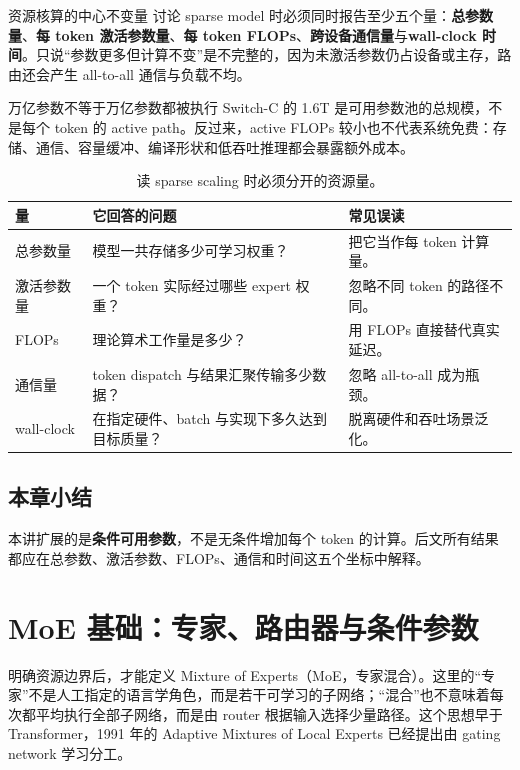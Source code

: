 \documentclass[a4paper]{article}
\begin{document}
\begin{importantbox}{资源核算的中心不变量}
讨论 sparse model 时必须同时报告至少五个量：\textbf{总参数量}、\textbf{每 token 激活参数量}、\textbf{每 token FLOPs}、\textbf{跨设备通信量}与\textbf{wall-clock 时间}。只说“参数更多但计算不变”是不完整的，因为未激活参数仍占设备或主存，路由还会产生 all-to-all 通信与负载不均。
\end{importantbox}

\begin{warningbox}{万亿参数不等于万亿参数都被执行}
Switch-C 的 1.6T 是可用参数池的总规模，不是每个 token 的 active path。反过来，active FLOPs 较小也不代表系统免费：存储、通信、容量缓冲、编译形状和低吞吐推理都会暴露额外成本。
\end{warningbox}

\begin{table}[H]
\centering
\small
\caption{读 sparse scaling 时必须分开的资源量。}
\begin{tabularx}{\textwidth}{L{0.22\textwidth}X X}
\toprule
量 & 它回答的问题 & 常见误读 \\
\midrule
总参数量 & 模型一共存储多少可学习权重？ & 把它当作每 token 计算量。 \\
激活参数量 & 一个 token 实际经过哪些 expert 权重？ & 忽略不同 token 的路径不同。 \\
FLOPs & 理论算术工作量是多少？ & 用 FLOPs 直接替代真实延迟。 \\
通信量 & token dispatch 与结果汇聚传输多少数据？ & 忽略 all-to-all 成为瓶颈。 \\
wall-clock & 在指定硬件、batch 与实现下多久达到目标质量？ & 脱离硬件和吞吐场景泛化。 \\
\bottomrule
\end{tabularx}
\end{table}

\subsection{本章小结}

本讲扩展的是\textbf{条件可用参数}，不是无条件增加每个 token 的计算。后文所有结果都应在总参数、激活参数、FLOPs、通信和时间这五个坐标中解释。

\section{MoE 基础：专家、路由器与条件参数}

明确资源边界后，才能定义 Mixture of Experts（MoE，专家混合）。这里的“专家”不是人工指定的语言学角色，而是若干可学习的子网络；“混合”也不意味着每次都平均执行全部子网络，而是由 router 根据输入选择少量路径。这个思想早于 Transformer，1991 年的 Adaptive Mixtures of Local Experts 已经提出由 gating network 学习分工。
\end{document}
